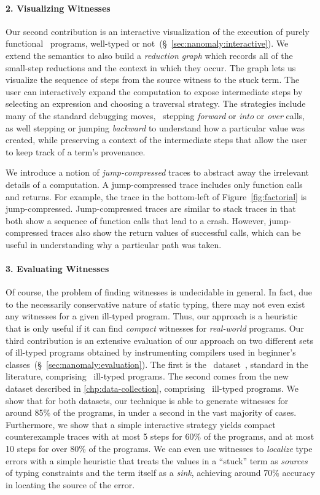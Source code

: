 \paragraph{2. Visualizing Witnesses}
Our second contribution is an interactive visualization of the
execution of purely functional \ocaml\ programs, well-typed or not~(\S~\ref{sec:nanomaly:interactive}).
%
We extend the semantics to also build a \emph{reduction graph}
which records all of the small-step reductions and the context
in which they occur.
%
The graph lets us visualize the sequence of
steps from the source witness to the stuck term. The user can
interactively expand the computation to expose intermediate steps
by selecting an expression and choosing a traversal strategy.
%
The strategies include many of the standard debugging moves, \eg\
stepping \emph{forward} or \emph{into} or \emph{over} calls, as well
stepping or jumping \emph{backward} to understand how a particular
value was created, while preserving a context of the intermediate
steps that allow the user to keep track of a term's provenance.

We introduce a notion of \emph{jump-compressed} traces to abstract away
the irrelevant details of a computation.
%
A jump-compressed trace includes only function
calls and returns. For example, the trace in the bottom-left of
Figure~\ref{fig:factorial} is jump-compressed.
%
Jump-compressed traces are similar to stack traces in that both show a
sequence of function calls that lead to a crash. However, jump-compressed
traces also show the return values of successful calls, which can be
useful in understanding why a particular path was taken.

\paragraph{3. Evaluating Witnesses}
%
Of course, the problem of finding witnesses is
undecidable in general. In fact, due to the necessarily
conservative nature of static typing, there
may not even exist any witnesses for a given
ill-typed program.
%
Thus, our approach is a heuristic that is only useful
if it can find \emph{compact} witnesses for
\emph{real-world} programs.
%
Our third contribution is an extensive evaluation of our approach
on two different sets of ill-typed programs obtained by instrumenting
compilers used in beginner's classes~(\S~\ref{sec:nanomaly:evaluation}).
%
The first is the \uwbench\ dataset~\cite{Lerner2007-dt}, standard in the
literature, comprising \uwsize\ ill-typed programs.
%
The second comes from the new dataset described in \autoref{chp:data-collection}, comprising \ucsdsize\
ill-typed programs.
%
We show that for both datasets, our technique is able to generate
witnesses for around 85\% of the programs, in under a second in the
vast majority of cases.
%
Furthermore, we show that a simple interactive strategy yields
compact counterexample traces with at most 5 steps for 60\%
of the programs, and at most 10 steps for over 80\% of the programs.
%
We can even use witnesses to \emph{localize} type errors with a simple
heuristic that treats the values in a ``stuck'' term as \emph{sources}
of typing constraints and the term itself as a \emph{sink},
achieving around 70\% accuracy in locating the source of the error.

